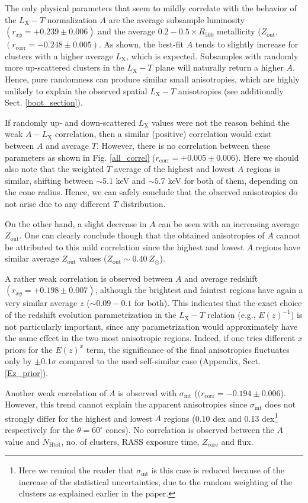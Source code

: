 \documentclass{aa}   %
\begin{document}
The only physical parameters that seem to mildly correlate with the behavior of the $L_{\text{X}}-T$ normalization $A$ are the average subsample luminosity $(r_{xy}=+0.239\pm0.006)$ and the average $0.2-0.5\times R_{500}$ metallicity ($Z_{\text{out}}$, $(r_{\text{corr}}=-0.248\pm0.005)$.  As shown, the best-fit $A$ tends to slightly increase for clusters with a higher average $L_{\text{X}}$, which is expected. Subsamples with randomly more up-scattered clusters in the $L_{\text{X}}-T$ plane will naturally return a higher $A$. Hence, pure randomness can produce similar small anisotropies, which are highly unlikely to explain the observed spatial $L_{\text{X}}-T$ anisotropies (see additionally Sect. \ref{boot_section}).

If randomly up- and down-scattered $L_{\text{X}}$ values were not the reason behind the weak $A-L_{\text{X}}$ correlation, then a similar (positive) correlation would exist between $A$ and average $T$. However, there is no correlation between these parameters as shown in Fig. \ref{all_correl} ($r_{\text{corr}}=+0.005\pm 0.006$). Here we should also note that the weighted $T$ average of the highest and lowest $A$ regions is similar, shifting between $\sim 5.1$ keV and $\sim 5.7$ keV for both of them, depending on the cone radius. Hence, we can safely conclude that the observed anisotropies do not arise due to any different $T$ distribution.

On the other hand, a slight decrease in $A$ can be seen with an increasing average $Z_{\text{out}}$. One can clearly conclude though that the obtained anisotropies of $A$ cannot be attributed to this mild correlation since the highest and lowest $A$ regions have similar average $Z_{\text{out}}$ values ($Z_{\text{out}}\sim 0.40\ Z_{\odot}$).

A rather weak correlation is observed between $A$ and average redshift $(r_{xy}=+0.198\pm0.007)$, although the brightest and faintest regions have again a very similar average $z$ ($\sim 0.09-0.1$ for both). This indicates that the exact choice of the redshift evolution parametrization in the $L_{\text{X}}-T$ relation (e.g., $E(z)^{-1}$) is not particularly important, since any parametrization would approximately have the same effect in the two most anisotropic regions. Indeed, if one tries different $x$ priors for the $E(z)^x$ term, the significance of the final anisotropies fluctuates only by $\pm0.1\sigma$ compared to the used self-similar case (Appendix, Sect. \ref{Ez_prior}).

Another weak correlation of $A$ is observed with $\sigma_{\text{int}}$ ($(r_{\text{corr}}=-0.194\pm 0.006$). However, this trend cannot explain the apparent anisotropies since $\sigma_{\text{int}}$ does not strongly differ for the highest and lowest $A$ regions (0.10 dex and 0.13 dex\footnote{Here we remind the reader that $\sigma_{\text{int}}$ is this case is reduced because of the increase of the statistical uncertainties, due to the random weighting of the clusters as explained earlier in the paper. } respectively for the $\theta=60^{\circ}$ cones). No correlation is observed between the $A$ value and $N_{\text{Htot}}$, no. of clusters, RASS exposure time, $Z_{\text{core}}$ and flux.
\end{document}
